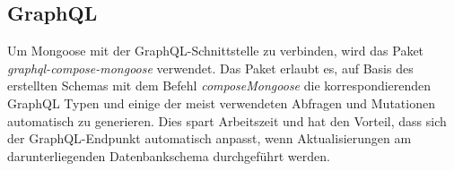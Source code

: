 \subsection{GraphQL}
Um Mongoose mit der GraphQL-Schnittstelle zu verbinden, wird das Paket \textit{graphql-compose-mongoose} verwendet. Das Paket erlaubt es, auf Basis des erstellten Schemas mit dem Befehl \textit{composeMongoose} die korrespondierenden GraphQL Typen und einige der meist verwendeten Abfragen und Mutationen automatisch zu generieren. Dies spart Arbeitszeit und hat den Vorteil, dass sich der GraphQL-Endpunkt automatisch anpasst, wenn Aktualisierungen am darunterliegenden Datenbankschema durchgeführt werden.